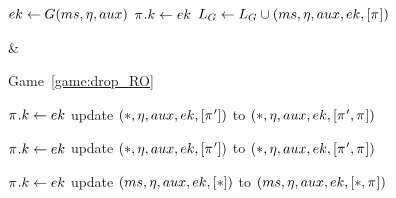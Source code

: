 \begin{figure}
\begin{leftfullpage}
\begin{adjustbox}{tabular={cc},Trim=0.9ex 0 0 0, width=\textwidth}
\begin{adjustbox}{minipage=[t][]{\codewidth},fbox}
\begin{algorithmic}[1]
			\color{black}
			
			\Else 
				\State {}
				\State $ek \gets G(ms, \eta, aux)$
				\State $\oracle.\key \gets ek$
				\State $L_G \gets L_G \cup (ms, \nonce, aux, ek, [\oracle]) $
			\EndIf
			
		\end{algorithmic}
	\end{adjustbox}

	&
	
	
	\begin{adjustbox}{minipage=[t][]{\codewidth},fbox}
		\begin{algorithmic}[1]	
		
			\Statex
			\Comment Game~\ref{game:drop_RO}
			\State {}
			
				\State $\oracle.\key \gets ek$
				\State update $(*, \nonce, aux, ek, [\oracle'])$ to $(*, \nonce, aux, ek, [\oracle', \oracle])$
		
			\color{black}
		
			
			\State \hspace*{-\algorithmicindent} 
				\State $\oracle.\key \gets ek$
				\State update $(*, \nonce, aux, ek, [\oracle'])$ to $(*, \nonce, aux, ek, [\oracle', \oracle])$
			
			\color{black}
		
			\State \hspace*{-\algorithmicindent} 
				\State $\oracle.\key \gets ek$
				\State update $(ms, \eta, aux, ek, [*])$ to $(ms, \nonce, aux, ek, [*,\oracle])$ \label{alg:line:send_game_hops:drop_RO:look_at_MS}
			
			\color{black}
			

\end{algorithmic}
\end{adjustbox}
\end{adjustbox}
\end{leftfullpage}
\end{figure}
